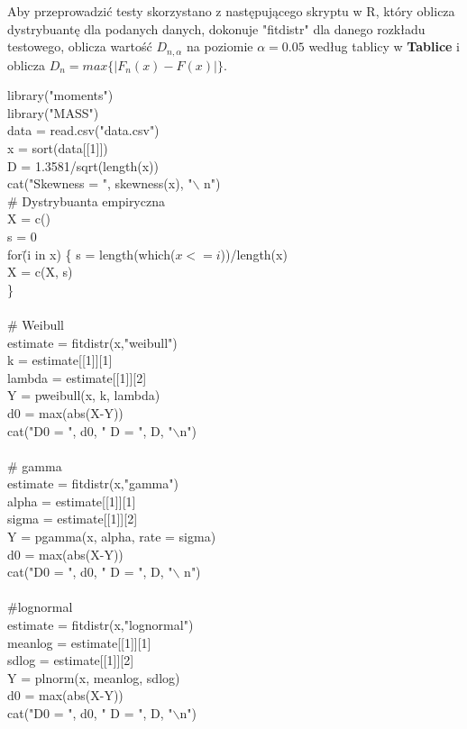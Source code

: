 \documentclass{article}
\begin{document}
Aby przeprowadzić testy skorzystano z następującego skryptu w R, który oblicza dystrybuantę dla podanych danych, dokonuje "fitdistr" dla danego rozkładu testowego, oblicza wartość $D_{n,\alpha}$ na poziomie $\alpha = 0.05$ według tablicy w \textbf{Tablice} i oblicza $D_n = max\{|F_n(x) - F(x)|\}$.
{\selectfont
\begin{tabbing}
library("moments") \\
library("MASS") \\
data = read.csv("data.csv") \\
x = sort(data[[1]]) \\
D = 1.3581/sqrt(length(x)) \\
cat("Skewness = ", skewness(x), "$\backslash$ n") \\
\# Dystrybuanta empiryczna \\
X = c() \\
s = 0 \\
for\=(i in x) \{ \+
	s = length(which($x <= i$))/length(x) \\
	X = c(X, s) \- \\
\} \\
\\
\# Weibull \\
estimate = fitdistr(x,"weibull") \\
k = estimate[[1]][1] \\
lambda = estimate[[1]][2] \\
Y = pweibull(x, k, lambda) \\
d0 = max(abs(X-Y)) \\
cat("D0 = ", d0, " D = ", D, "$\backslash$n") \\
\\
\# gamma \\
estimate = fitdistr(x,"gamma") \\
alpha = estimate[[1]][1] \\
sigma = estimate[[1]][2] \\
Y = pgamma(x, alpha, rate = sigma) \\
d0 = max(abs(X-Y)) \\
cat("D0 = ", d0, " D = ", D, "$\backslash$ n") \\
\\
\#lognormal \\
estimate = fitdistr(x,"lognormal") \\
meanlog = estimate[[1]][1] \\
sdlog = estimate[[1]][2] \\
Y = plnorm(x, meanlog, sdlog) \\
d0 = max(abs(X-Y)) \\
cat("D0 = ", d0, " D = ", D, "$\backslash$n")
\end{tabbing}}
\end{document}
